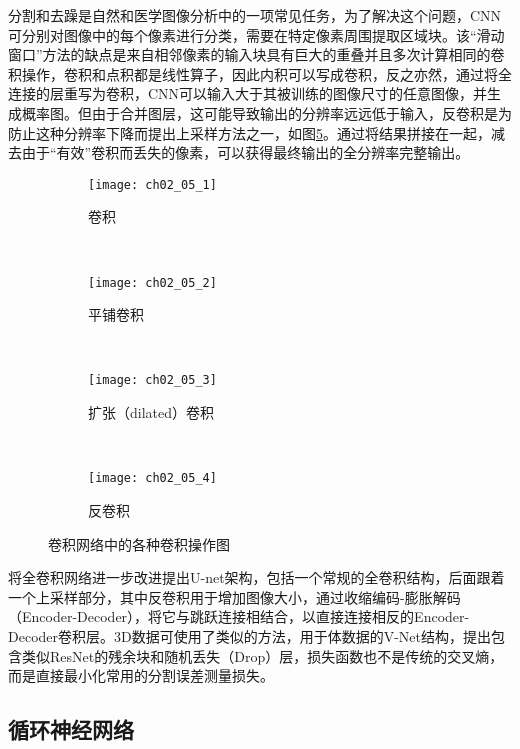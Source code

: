 分割和去躁是自然和医学图像分析中的一项常见任务，为了解决这个问题，CNN可分别对图像中的每个像素进行分类，需要在特定像素周围提取区域块。该“滑动窗口”方法的缺点是来自相邻像素的输入块具有巨大的重叠并且多次计算相同的卷积操作，卷积和点积都是线性算子，因此内积可以写成卷积，反之亦然，通过将全连接的层重写为卷积，CNN可以输入大于其被训练的图像尺寸的任意图像，并生成概率图。但由于合并图层，这可能导致输出的分辨率远远低于输入，反卷积\citep{Long2017Fully}是为防止这种分辨率下降而提出上采样方法之一，如图\ref{fig:ch02_05}。通过将结果拼接在一起，减去由于“有效”卷积而丢失的像素，可以获得最终输出的全分辨率完整输出。
\begin{figure}[!htbp]
    \centering
    \begin{subfigure}[b]{0.45\textwidth}
        \texttt{[image: ch02\_05\_1]}
        \caption{卷积}
        \label{fig:ch02_05_1}
    \end{subfigure}%
    ~%
    \begin{subfigure}[b]{0.45\textwidth}
        \texttt{[image: ch02\_05\_2]}
        \caption{平铺卷积}
        \label{fig:ch02_05_02}
    \end{subfigure}
    ~%
    \begin{subfigure}[b]{0.45\textwidth}
        \texttt{[image: ch02\_05\_3]}
        \caption{扩张（dilated）卷积}
        \label{fig:ch02_05_03}
    \end{subfigure}
    ~%
    \begin{subfigure}[b]{0.45\textwidth}
        \texttt{[image: ch02\_05\_4]}
        \caption{反卷积}
        \label{fig:ch02_05_04}
    \end{subfigure}
    \caption{卷积网络中的各种卷积操作图}
    \label{fig:ch02_05}
\end{figure}
将全卷积网络进一步改进提出U-net架构\cite{Ronneberger2015}，包括一个常规的全卷积结构，后面跟着一个上采样部分，其中反卷积用于增加图像大小，通过收缩编码-膨胀解码（Encoder-Decoder），将它与跳跃连接\citep{he15}相结合，以直接连接相反的Encoder-Decoder卷积层。3D数据可使用了类似的方法，\cite{Milletari2016}用于体数据的V-Net结构，提出包含类似ResNet的残余块和随机丢失（Drop）层，损失函数也不是传统的交叉熵，而是直接最小化常用的分割误差测量损失。 

\subsection{循环神经网络}
\label{sec:rnns}

